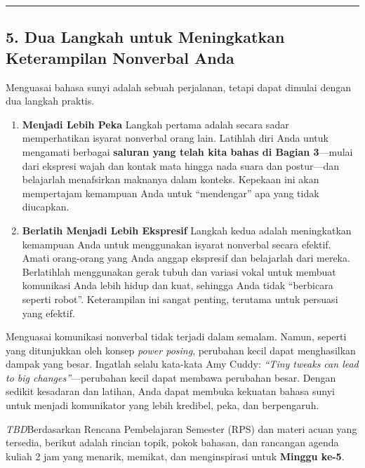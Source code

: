 \documentclass[
  letterpaper,
  DIV=11,
  numbers=noendperiod]{scrreprt}
\begin{document}
\begin{center}\rule{0.5\linewidth}{0.5pt}\end{center}

\subsection{5. Dua Langkah untuk Meningkatkan Keterampilan Nonverbal
Anda}\label{dua-langkah-untuk-meningkatkan-keterampilan-nonverbal-anda}

Menguasai bahasa sunyi adalah sebuah perjalanan, tetapi dapat dimulai
dengan dua langkah praktis.

\begin{enumerate}
\def\labelenumi{\arabic{enumi}.}
\item
  \textbf{Menjadi Lebih Peka} Langkah pertama adalah secara sadar
  memperhatikan isyarat nonverbal orang lain. Latihlah diri Anda untuk
  mengamati berbagai \textbf{saluran yang telah kita bahas di Bagian
  3}---mulai dari ekspresi wajah dan kontak mata hingga nada suara dan
  postur---dan belajarlah menafsirkan maknanya dalam konteks. Kepekaan
  ini akan mempertajam kemampuan Anda untuk ``mendengar'' apa yang tidak
  diucapkan.
\item
  \textbf{Berlatih Menjadi Lebih Ekspresif} Langkah kedua adalah
  meningkatkan kemampuan Anda untuk menggunakan isyarat nonverbal secara
  efektif. Amati orang-orang yang Anda anggap ekspresif dan belajarlah
  dari mereka. Berlatihlah menggunakan gerak tubuh dan variasi vokal
  untuk membuat komunikasi Anda lebih hidup dan kuat, sehingga Anda
  tidak ``berbicara seperti robot''. Keterampilan ini sangat penting,
  terutama untuk persuasi yang efektif.
\end{enumerate}

Menguasai komunikasi nonverbal tidak terjadi dalam semalam. Namun,
seperti yang ditunjukkan oleh konsep \emph{power posing}, perubahan
kecil dapat menghasilkan dampak yang besar. Ingatlah selalu kata-kata
Amy Cuddy: \emph{``Tiny tweaks can lead to big changes''}---perubahan
kecil dapat membawa perubahan besar. Dengan sedikit kesadaran dan
latihan, Anda dapat membuka kekuatan bahasa sunyi untuk menjadi
komunikator yang lebih kredibel, peka, dan berpengaruh.

\emph{TBD}Berdasarkan Rencana Pembelajaran Semester (RPS) dan materi
acuan yang tersedia, berikut adalah rincian topik, pokok bahasan, dan
rancangan agenda kuliah 2 jam yang menarik, memikat, dan menginspirasi
untuk \textbf{Minggu ke-5}.
\end{document}
